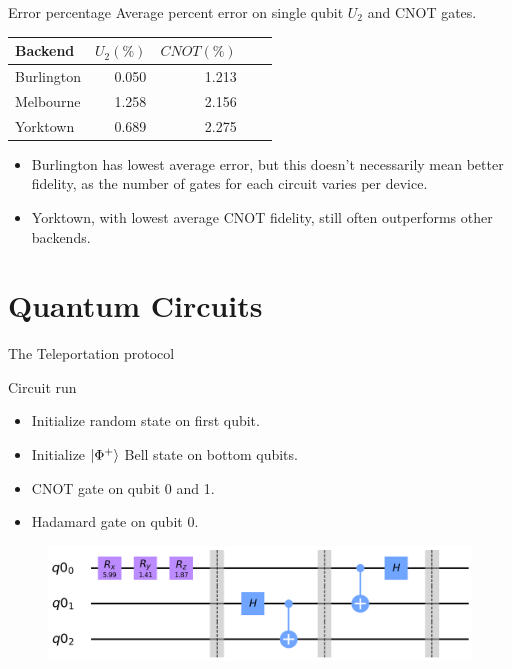 \begin{frame}{Error percentage}
Average percent error on single qubit $U_2$ and CNOT gates.
\vspace{0.5cm}
\begin{table} \centering
	\begin{tabular}{lrrrr} \toprule Backend & $U_2 (\%)$ & $CNOT (\%)$ \\ \midrule
		Burlington & 0.050 & 1.213 \\ Melbourne & 1.258 & 2.156 \\ Yorktown & 0.689 &
		2.275 \\ \bottomrule
	\end{tabular}
	\label{tb:average_errors}
\end{table}
\vspace{0.5cm}
\begin{itemize}
  \item Burlington has lowest average error, but this doesn't necessarily mean
better fidelity, as the number of gates for each circuit varies per device.
  \item Yorktown, with lowest average CNOT fidelity, still often outperforms other
backends.
\end{itemize}
\end{frame}

\section{Quantum Circuits}

\begin{frame}{The Teleportation protocol}
	
	\begin{block}{Circuit run}
		\begin{itemize}
			\item Initialize random state on first qubit.
			\item Initialize $\ket{\Phi^+}$ Bell state on bottom qubits.
			\item CNOT gate on qubit 0 and 1.
			\item Hadamard gate on qubit 0.
		\end{itemize}
	\end{block}
	
	\begin{figure}[h] \centering
		\includegraphics[width=\textwidth]{images/teleport_circuit.png}
		\label{fig:tele_circ}
	\end{figure}

\end{frame}


